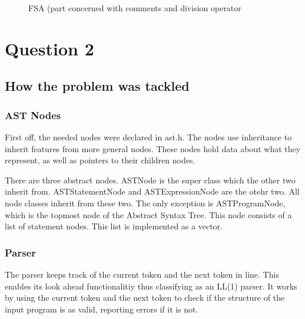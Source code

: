 \documentclass[a4paper, 12pt]{article}
\begin{document}
\begin{figure}[h]
    \centering
    \caption{FSA (part concerned with comments and division operator}
\end{figure}

\section{Question 2}
\subsection{How the problem was tackled}
\subsubsection{AST Nodes}
First off, the needed nodes were declared in ast.h. The nodes use inheritance to inherit features from more general nodes. These
nodes hold data about what they represent, as well as pointers to their children nodes.
\linebreak

There are three abstract nodes. ASTNode is the super class which the other two inherit from. ASTStatementNode and ASTExpressionNode
are the otehr two.
All node classes inherit from these two. The only exception is ASTProgramNode, which is the topmost node of the Abstract Syntax
Tree. This node consists of a list of statement nodes. This list is implemented
as a vector.

\subsubsection{Parser}
The parser keeps track of the current token and the next token in line. This enables its look ahead functionalitiy thus classifying 
as an LL(1) parser. It works by using the current token and the next token to check if the structure of the input program is as
valid, reporting errors if it is not.
\end{document}

